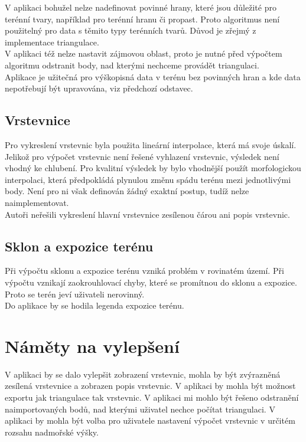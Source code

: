 \documentclass[a4paper, 12pt]{article}
\begin{document}
V aplikaci bohužel nelze nadefinovat povinné hrany, které jsou důležité pro terénní tvary, například pro terénní hranu či propast. Proto algoritmus není použitelný pro data s těmito typy terénních tvarů. Důvod je zřejmý z implementace triangulace.\\

V aplikaci též nelze nastavit zájmovou oblast, proto je nutné před výpočtem algoritmu odstranit body, nad kterými nechceme provádět triangulaci.\\

Aplikace je užitečná pro výškopisná data v terénu bez povinných hran a kde data nepotřebují být upravována, viz předchozí odstavec. \\

\subsection{Vrstevnice}
Pro vykreslení vrstevnic byla použita lineární interpolace, která má svoje úskalí. Jelikož pro výpočet vrstevnic není řešené vyhlazení vrstevnic, výsledek není vhodný ke chlubení. Pro kvalitní výsledek by bylo vhodnější použít morfologickou interpolaci, která předpokládá plynulou změnu spádu terénu mezi jednotlivými body. Není pro ni však definován žádný exaktní postup, tudíž nelze naimplementovat. \\

Autoři neřešili vykreslení hlavní vrstevnice zesílenou čárou ani popis vrstevnic. \\

\subsection{Sklon a expozice terénu}
Při výpočtu sklonu a expozice terénu vzniká problém v rovinatém území. Při výpočtu vznikají zaokrouhlovací chyby, které se promítnou do sklonu a expozice. Proto se terén jeví uživateli nerovinný.\\

Do aplikace by se hodila legenda expozice terénu.\\

\section{Náměty na vylepšení}
V aplikaci by se dalo vylepšit zobrazení vrstevnic, mohla by být zvýrazněná zesílená vrstevnice a zobrazen popis vrstevnic. 
V aplikaci by mohla být možnost exportu jak triangulace tak vrstevnic. 
V aplikaci mi mohlo být řešeno odstranění naimportovaných bodů, nad kterými uživatel nechce počítat triangulaci. 
V aplikaci by mohla být volba pro uživatele nastavení výpočet vrstevnic v určitém rozsahu nadmořské výšky.\\
\end{document}
